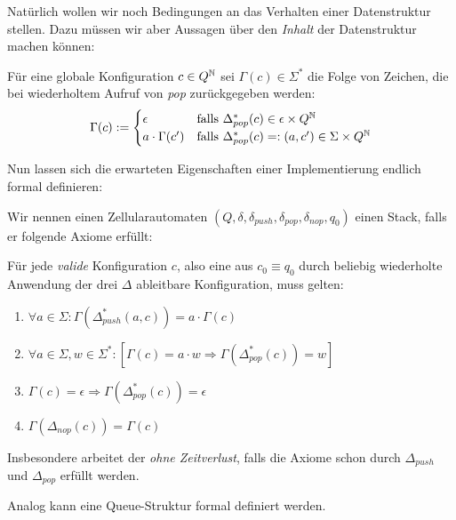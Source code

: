 \documentclass{article}
\begin{document}
Natürlich wollen wir noch Bedingungen an das Verhalten einer Datenstruktur stellen. Dazu müssen wir aber Aussagen über den \emph{Inhalt} der Datenstruktur machen können:
\begin{definition}
    Für eine globale Konfiguration $c \in Q^{\mathbb{N}}$ sei $\Gamma(c) \in \Sigma^*$ die Folge von Zeichen, die bei wiederholtem Aufruf von \emph{pop} zurückgegeben werden:
    $$ \Gamma(c) := \begin{cases}
        \epsilon &\text{falls } \Delta^*_{pop}(c) \in \epsilon \times Q^{\mathbb{N}} \\
        a \cdot \Gamma(c') &\text{falls }\Delta^*_{pop}(c)=:(a,c') \in \Sigma \times Q^{\mathbb{N}}
    \end{cases} $$
\end{definition}

Nun lassen sich die erwarteten Eigenschaften einer Implementierung endlich formal definieren:
\begin{definition}
    Wir nennen einen Zellularautomaten $(Q, \delta, \delta_{push}, \delta_{pop}, \delta_{nop}, q_0)$ einen Stack, falls er folgende Axiome erfüllt:

    Für jede \emph{valide} Konfiguration $c$, also eine aus $c_0 \equiv q_0$ durch beliebig wiederholte Anwendung der drei $\Delta$ ableitbare Konfiguration, muss gelten:
    \begin{enumerate}
        \item $\forall a \in \Sigma: \Gamma(\Delta^*_{push}(a,c)) = a \cdot \Gamma(c)$
        \item $\forall a \in \Sigma, w \in \Sigma^*: \left[ \Gamma(c) = a \cdot w \Rightarrow \Gamma(\Delta^*_{pop}(c)) = w \right]$
        \item $\Gamma(c) = \epsilon \Rightarrow \Gamma(\Delta^*_{pop}(c)) = \epsilon $
        \item $\Gamma(\Delta_{nop}(c)) = \Gamma(c)$
    \end{enumerate}
    Insbesondere arbeitet der \emph{ohne Zeitverlust}, falls die Axiome schon durch $\Delta_{push}$ und $\Delta_{pop}$ erfüllt werden.
\end{definition}

Analog kann eine Queue-Struktur formal definiert werden.
\end{document}
